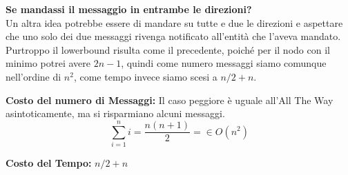 \textbf{Se mandassi il messaggio in entrambe le direzioni?}\\
Un altra idea potrebbe essere di mandare su tutte e due le direzioni e aspettare che uno solo dei due messaggi rivenga notificato all'entità che l'aveva mandato.\\
Purtroppo il lowerbound risulta come il precedente, poiché per il nodo con il minimo potrei avere $2n - 1$, quindi come numero messaggi siamo comunque nell'ordine di $n^2$, come tempo invece siamo scesi a $n/2 + n$.

\textbf{Costo del numero di Messaggi:} Il caso peggiore è uguale all'All The Way asintoticamente, ma si risparmiano alcuni messaggi.
$$\sum_{i=1}^{n} i = \frac{n(n+1)}{2} =  \in O(n^2)$$

\textbf{Costo del Tempo:} $n/2 + n$\\


